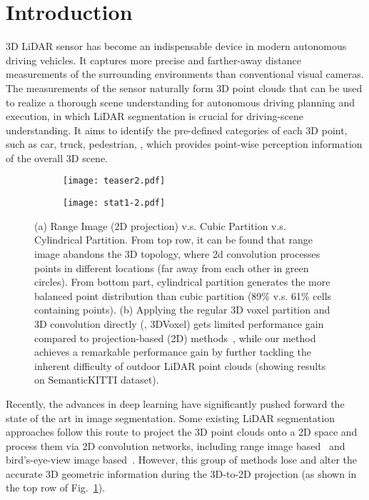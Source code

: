 \documentclass[final]{cvpr}
\begin{document}
\section{Introduction}
	 3D {LiDAR} sensor has become an {indispensable device} in {modern} autonomous driving {vehicles}. It {captures} more precise and farther-away {distance measurements of the surrounding environments} than conventional visual cameras. The measurements of the sensor naturally form 3D point clouds that can be used to realize a thorough scene understanding for autonomous driving planning and execution,
	 in which LiDAR segmentation is crucial for driving-scene understanding. It aims to identify the pre-defined categories of each 3D point, such as {car, truck, pedestrian,} \etc, which provides point-wise perception information of the overall 3D scene.
	


    \begin{figure*}
    \centering
    \begin{subfigure}[t]{0.6\textwidth}
    \centering
    \texttt{[image: teaser2.pdf]}
    \caption{}
    \label{fig:2d_3d_conv}
    \end{subfigure}
    \hfil
    \begin{subfigure}[t]{0.3\textwidth}
        \texttt{[image: stat1-2.pdf]}
    \caption{}
    \label{fig:stat1}
    \end{subfigure}
    \vspace{-1ex}
    \caption{(a) Range Image (2D projection) v.s. Cubic Partition v.s. Cylindrical Partition. From top row, it can be found that range image abandons the 3D topology, where 2d convolution processes points in different locations (far away from each other in green circles). From bottom part, cylindrical partition generates the more balanced point distribution than cubic partition (89\% v.s. 61\% cells containing points). (b) Applying the regular 3D voxel partition and 3D convolution directly (\ie, 3DVoxel) gets limited performance gain compared to projection-based (2D) methods~\cite{zhang2020polarnet, hu2020randla, milioto2019rangenet++, xu2020squeezesegv3}, while our method achieves a remarkable performance gain by further tackling the inherent difficulty of outdoor LiDAR point clouds (showing results on SemanticKITTI dataset).
    }
    \label{fig:teaser}
    \vspace{-3ex}
    \end{figure*}
    
    Recently, the advances in deep learning have significantly pushed forward the state of the art in image segmentation. Some existing LiDAR segmentation approaches follow this route to project the 3D point clouds onto a 2D space and process them via 2D convolution networks, including range image based~\cite{milioto2019rangenet++,wu2018squeezeseg} and bird's-eye-view
   image based~\cite{zhang2020polarnet}. However, this group of methods lose and alter the accurate 3D geometric information during the 3D-to-2D projection (as shown in the top row of Fig.~\ref{fig:2d_3d_conv}).
   
\end{document}
